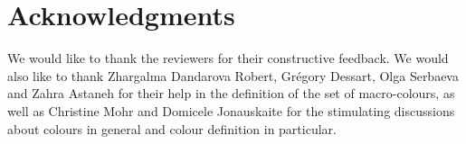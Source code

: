 \documentclass[11pt,a4paper]{article}
\begin{document}
\section*{Acknowledgments}
We would like to thank the reviewers for their constructive feedback. We would also like to thank Zhargalma Dandarova Robert, Gr\'{e}gory Dessart, Olga Serbaeva and Zahra Astaneh for their help in the definition of the set of macro-colours, as well as Christine Mohr and Domicele Jonauskaite for the stimulating discussions about colours in general and colour definition in particular.



\end{document}
